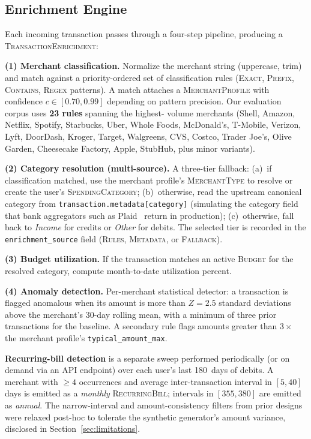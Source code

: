 \documentclass[conference]{IEEEtran}
\begin{document}
\subsection{Enrichment Engine}
\label{sec:enrichment}

Each incoming transaction passes through a four-step pipeline,
producing a \textsc{TransactionEnrichment}:

\textbf{(1) Merchant classification.} Normalize the merchant
string (uppercase, trim) and match against a priority-ordered set
of classification rules (\textsc{Exact}, \textsc{Prefix},
\textsc{Contains}, \textsc{Regex} patterns). A match attaches a
\textsc{MerchantProfile} with confidence
$c \in [0.70, 0.99]$ depending on pattern precision. Our
evaluation corpus uses \textbf{23 rules} spanning the highest-
volume merchants (Shell, Amazon, Netflix, Spotify, Starbucks, Uber,
Whole Foods, McDonald's, T-Mobile, Verizon, Lyft, DoorDash, Kroger,
Target, Walgreens, CVS, Costco, Trader Joe's, Olive Garden,
Cheesecake Factory, Apple, StubHub, plus minor variants).

\textbf{(2) Category resolution (multi-source).} A three-tier
fallback: (a)~if classification matched, use the merchant profile's
\textsc{MerchantType} to resolve or create the user's
\textsc{SpendingCategory}; (b)~otherwise, read the upstream
canonical category from \texttt{transaction.metadata[category]}
(simulating the category field that bank aggregators such as
Plaid~\cite{plaid} return in production); (c)~otherwise, fall back
to \emph{Income} for credits or \emph{Other} for debits. The
selected tier is recorded in the \texttt{enrichment\_source} field
(\textsc{Rules}, \textsc{Metadata}, or \textsc{Fallback}).

\textbf{(3) Budget utilization.} If the transaction matches an
active \textsc{Budget} for the resolved category, compute
month-to-date utilization percent.

\textbf{(4) Anomaly detection.} Per-merchant statistical detector:
a transaction is flagged anomalous when its amount is more than
$Z = 2.5$ standard deviations above the merchant's 30-day rolling
mean, with a minimum of three prior transactions for the baseline.
A secondary rule flags amounts greater than $3\times$ the merchant
profile's \texttt{typical\_amount\_max}.

\textbf{Recurring-bill detection} is a separate sweep performed
periodically (or on demand via an API endpoint) over each user's
last 180~days of debits. A merchant with $\geq 4$ occurrences and
average inter-transaction interval in $[5, 40]$ days is emitted as
a \emph{monthly} \textsc{RecurringBill}; intervals in $[355, 380]$
are emitted as \emph{annual}. The narrow-interval and
amount-consistency filters from prior designs were relaxed
post-hoc to tolerate the synthetic generator's amount variance,
disclosed in Section~\ref{sec:limitations}.
\end{document}
